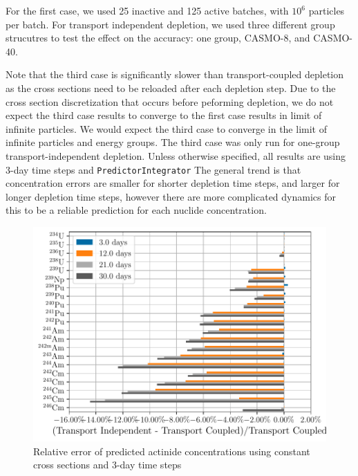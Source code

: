     For the first case, we used 25 inactive and 125 active batches, with $10^6$
    particles per batch. For transport independent depletion, we used three
    different group strucutres to test the effect on the accuracy: one group,
    CASMO-8, and CASMO-40.

    Note that the third case is significantly slower than transport-coupled
    depletion as the cross sections need to be reloaded after each depletion
    step. Due to the cross section discretization that occurs before peforming
    depletion, we do not expect the third case results to converge to the first
    case results in limit of infinite particles. We would expect the third case
    to converge in the limit of infinite particles and energy groups. The third
    case was only run for one-group transport-independent depletion. Unless
    otherwise specified, all results are using 3-day time steps and
    \verb.PredictorIntegrator. The general trend is that concentration errors
    are smaller for shorter depletion time steps, and larger for longer
    depletion time steps, however there are more complicated dynamics for this
    to be a reliable prediction for each nuclide concentration.

    \begin{figure}[h!tpb]
        \centering
        \includegraphics[width=\linewidth]{figs/actinides_constant_xs_predictor_fission_q_days.pdf}
        \caption[]{Relative error of predicted actinide concentrations using
        constant cross sections and 3-day time steps}
        \label{fig:actinides-error-constant-xs-days}
    \end{figure}

